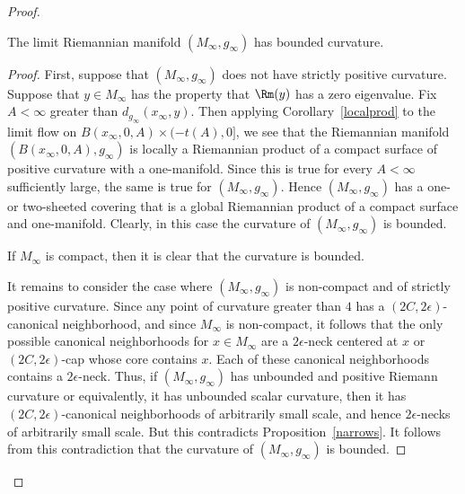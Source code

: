 \begin{proof}
\begin{claim}
\label{claim:limit-bounded-curvature}
The limit Riemannian manifold $(M_\infty,g_\infty)$ has bounded
curvature.
\end{claim}


\begin{proof}
First, suppose that $(M_\infty,g_\infty)$ does not have strictly
positive curvature. Suppose that $y\in M_\infty$ has the property
that $\Rm(y)$ has a zero eigenvalue. Fix $A<\infty$ greater
than $d_{g_\infty}(x_\infty,y)$. Then applying
Corollary~\ref{localprod} to the limit flow on
$B(x_\infty,0,A)\times (-t(A),0]$,  we see that the Riemannian
manifold $(B(x_\infty,0,A),g_\infty)$  is locally a Riemannian
product of a compact surface of positive curvature with a
one-manifold. Since this is true for every $A<\infty$ sufficiently
large, the same is true for $(M_\infty,g_\infty)$. Hence
$(M_\infty,g_\infty)$ has a one- or two-sheeted covering that is a
global Riemannian product of a compact surface and one-manifold.
Clearly, in this case the curvature of $(M_\infty,g_\infty)$ is
bounded.


If $M_\infty$ is compact, then it is clear that the curvature is
bounded.

It remains to consider the  case where $(M_\infty,g_\infty)$ is
non-compact and of strictly positive curvature. Since any point of
curvature greater than $4$ has a $(2C,2\epsilon)$-canonical
neighborhood, and since $M_\infty$ is non-compact, it follows that
the only possible canonical neighborhoods for $x\in M_\infty$ are  a
$2\epsilon$-neck centered at $x$  or $(2C,2\epsilon)$-cap whose core
contains $x$.  Each of these canonical neighborhoods contains a
$2\epsilon$-neck. Thus, if $(M_\infty,g_\infty)$ has unbounded and
positive Riemann curvature or equivalently, it has  unbounded scalar
curvature, then it has $(2C,2\epsilon)$-canonical neighborhoods of
arbitrarily small scale, and hence $2\epsilon$-necks of arbitrarily
small scale. But this contradicts Proposition~\ref{narrows}. It
follows from this contradiction that the curvature of
$(M_\infty,g_\infty)$ is bounded.
\end{proof}



\end{proof}
